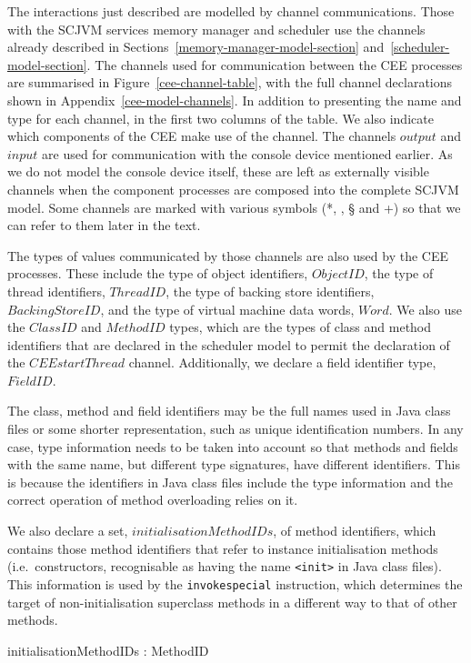 The interactions just described are modelled by channel
communications.
Those with the SCJVM services memory manager and scheduler use the
channels already described in
Sections~\ref{memory-manager-model-section}
and~\ref{scheduler-model-section}.
The channels used for communication between the CEE processes are
summarised in Figure~\ref{cee-channel-table}, with the full channel
declarations shown in Appendix~\ref{cee-model-channels}.
In addition to presenting the name and type for each channel, in the
first two columns of the table.
We also indicate which components of the CEE make use of the channel.
The channels $output$ and $input$ are used for communication with the
console device mentioned earlier.
As we do not model the console device itself, these are left as
externally visible channels when the component processes are composed
into the complete SCJVM model.
Some channels are marked with various symbols (*, \dag{}, \S{} and
{}+{}) so that we can refer to them later in the text.

The types of values communicated by those channels are also used by
the CEE processes.
These include the type of object identifiers, $ObjectID$, the type of
thread identifiers, $ThreadID$, the type of backing store identifiers,
$BackingStoreID$, and the type of virtual machine data words, $Word$.
We also use the $ClassID$ and $MethodID$ types, which are the types of
class and method identifiers that are declared in the scheduler model
to permit the declaration of the $CEEstartThread$ channel.
Additionally, we declare a field identifier type, $FieldID$.
\begin{zed}
  [FieldID]
\end{zed}
The class, method and field identifiers may be the full names used in
Java class files or some shorter representation, such as unique
identification numbers.
In any case, type information needs to be taken into account so that
methods and fields with the same name, but different type signatures,
have different identifiers.
This is because the identifiers in Java class files include the type
information and the correct operation of method overloading relies on
it.

We also declare a set, $initialisationMethodIDs$, of method
identifiers, which contains those method identifiers that refer to
instance initialisation methods (i.e.\ constructors, recognisable as
having the name \texttt{\textless{}init\textgreater{}} in Java class
files).
This information is used by the \texttt{invokespecial} instruction,
which determines the target of non-initialisation superclass methods
in a different way to that of other methods.
\begin{axdef}
	initialisationMethodIDs : \power MethodID
\end{axdef}

